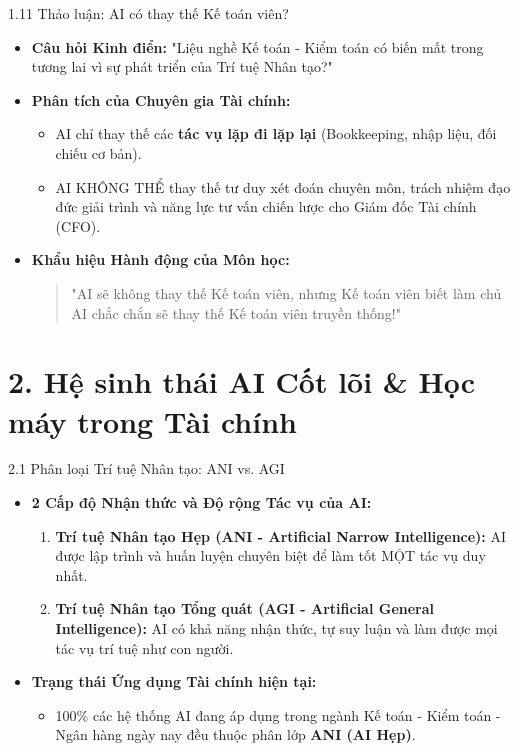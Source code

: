 \documentclass[aspectratio=169]{beamer}
\begin{document}
\begin{frame}{1.11 Thảo luận: AI có thay thế Kế toán viên?}
    \begin{itemize}
        \item \textbf{Câu hỏi Kinh điển:} "Liệu nghề Kế toán - Kiểm toán có biến mất trong tương lai vì sự phát triển của Trí tuệ Nhân tạo?"
        \item \textbf{Phân tích của Chuyên gia Tài chính:}
        \begin{itemize}
            \item AI chỉ thay thế các \textbf{tác vụ lặp đi lặp lại} (Bookkeeping, nhập liệu, đối chiếu cơ bản).
            \item AI KHÔNG THỂ thay thế tư duy xét đoán chuyên môn, trách nhiệm đạo đức giải trình và năng lực tư vấn chiến lược cho Giám đốc Tài chính (CFO).
        \end{itemize}
        \item \textbf{Khẩu hiệu Hành động của Môn học:}
        \begin{quote}
            "AI sẽ không thay thế Kế toán viên, nhưng Kế toán viên biết làm chủ AI chắc chắn sẽ thay thế Kế toán viên truyền thống!"
        \end{quote}
    \end{itemize}
\end{frame}

\section{2. Hệ sinh thái AI Cốt lõi \& Học máy trong Tài chính}

\begin{frame}{2.1 Phân loại Trí tuệ Nhân tạo: ANI vs. AGI}
    \begin{itemize}
        \item \textbf{2 Cấp độ Nhận thức và Độ rộng Tác vụ của AI:}
        \begin{enumerate}
            \item \textbf{Trí tuệ Nhân tạo Hẹp (ANI - Artificial Narrow Intelligence):} AI được lập trình và huấn luyện chuyên biệt để làm tốt MỘT tác vụ duy nhất.
            \item \textbf{Trí tuệ Nhân tạo Tổng quát (AGI - Artificial General Intelligence):} AI có khả năng nhận thức, tự suy luận và làm được mọi tác vụ trí tuệ như con người.
        \end{enumerate}
        \item \textbf{Trạng thái Ứng dụng Tài chính hiện tại:}
        \begin{itemize}
            \item 100\% các hệ thống AI đang áp dụng trong ngành Kế toán - Kiểm toán - Ngân hàng ngày nay đều thuộc phân lớp \textbf{ANI (AI Hẹp)}.
        \end{itemize}
    \end{itemize}
\end{frame}
\end{document}
